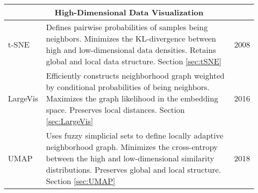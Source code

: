 \begin{longtable}{ |p{}|p{}|p{}| }
	\hline
	\multicolumn{3}{|c|}{\textbf{High-Dimensional Data Visualization}}\\
	\hline
	t-SNE  & Defines pairwise probabilities of samples being neighbors.  Minimizes the KL-divergence between high and low-dimensional data densities. Retains global and local data structure. Section \ref{sec:tSNE} & 2008 \\
	\hline
	LargeVis  & Efficiently constructs neighborhood graph weighted by conditional probabilities of being neighbors.  Maximizes the graph likelihood in the embedding space. Preserves local distances. Section \ref{sec:LargeVis} & 2016 \\
	\hline
	UMAP  & Uses fuzzy simplicial sets to define locally adaptive neighborhood graph.  Minimizes the cross-entropy between the high and low-dimensional similarity distributions. Preserves global and local structure.  Section \ref{sec:UMAP}  & 2018 \\
	\hline
\end{longtable}


